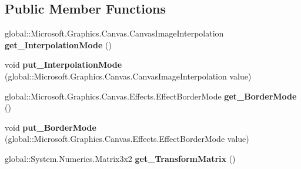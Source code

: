 \subsection*{Public Member Functions}
\begin{DoxyCompactItemize}
\item 
\mbox{\label{interface_microsoft_1_1_graphics_1_1_canvas_1_1_effects_1_1_i_transform2_d_effect_a28c7f549ffaf7fe034240f0365a040f5}} 
global\+::\+Microsoft.\+Graphics.\+Canvas.\+Canvas\+Image\+Interpolation {\bfseries get\+\_\+\+Interpolation\+Mode} ()
\item 
\mbox{\label{interface_microsoft_1_1_graphics_1_1_canvas_1_1_effects_1_1_i_transform2_d_effect_a864876e7bc5994cb6e25e49e9a00b3bb}} 
void {\bfseries put\+\_\+\+Interpolation\+Mode} (global\+::\+Microsoft.\+Graphics.\+Canvas.\+Canvas\+Image\+Interpolation value)
\item 
\mbox{\label{interface_microsoft_1_1_graphics_1_1_canvas_1_1_effects_1_1_i_transform2_d_effect_abd77cabb47b8cf0111ae871cdedf9046}} 
global\+::\+Microsoft.\+Graphics.\+Canvas.\+Effects.\+Effect\+Border\+Mode {\bfseries get\+\_\+\+Border\+Mode} ()
\item 
\mbox{\label{interface_microsoft_1_1_graphics_1_1_canvas_1_1_effects_1_1_i_transform2_d_effect_a38434702873fe7cbe1f7303fd42c85de}} 
void {\bfseries put\+\_\+\+Border\+Mode} (global\+::\+Microsoft.\+Graphics.\+Canvas.\+Effects.\+Effect\+Border\+Mode value)
\item 
\mbox{\label{interface_microsoft_1_1_graphics_1_1_canvas_1_1_effects_1_1_i_transform2_d_effect_ac948729dfbfa255235037cd2b8a44715}} 
global\+::\+System.\+Numerics.\+Matrix3x2 {\bfseries get\+\_\+\+Transform\+Matrix} ()
\item 
\mbox{\label{interface_microsoft_1_1_graphics_1_1_canvas_1_1_effects_1_1_i_transform2_d_effect_a053a9b302520e44c813aa3355df1c959}} 

\end{DoxyCompactItemize}
